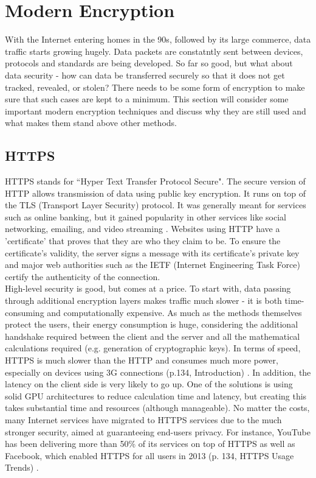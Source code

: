 \documentclass[a4paper, 12pt, titlepage]{article}
\begin{document}
\section{Modern Encryption}
With the Internet entering homes in the 90s, followed by its large commerce, data traffic starts growing hugely. Data packets are constatntly sent between devices, protocols and standards are being developed. So far so good, but what about data security - how can data be transferred securely so that it does not get tracked, revealed, or stolen? There needs to be some form of encryption to make sure that such cases are kept to a minimum. This section will consider some important modern encryption techniques and discuss why they are still used and what makes them stand above other methods.

\subsection{HTTPS}
HTTPS stands for ``Hyper Text Transfer Protocol Secure". The secure version of HTTP allows transmission of data using public key encryption. It runs on top of the TLS (Transport Layer Security) protocol. It was generally meant for services such as online banking, but it gained popularity in other services like social networking, emailing, and video streaming \cite{HTTPSCosts}. Websites using HTTP have a 'certificate' that proves that they are who they claim to be. To ensure the certificate's validity, the server signs a message with its certificate's private key and major web authorities such as the IETF (Internet Engineering Task Force) certify the authenticity of the connection. \\[6pt]
High-level security is good, but comes at a price. To start with, data passing through additional encryption layers makes traffic much slower - it is both time-consuming and computationally expensive. As much as the methods themselves protect the users, their energy consumption is huge, considering the additional handshake required between the client and the server and all the mathematical calculations required (e.g. generation of cryptographic keys). In terms of speed, HTTPS is much slower than the HTTP and consumes much more power, especially on devices using 3G connections (p.134, Introduction) \cite{HTTPSCosts}. In addition, the latency on the client side is very likely to go up. One of the solutions is using solid GPU architectures to reduce calculation time and latency, but creating this takes substantial time and resources (although manageable). No matter the costs, many Internet services have migrated to HTTPS services due to the much stronger security, aimed at guaranteeing end-users privacy. For instance, YouTube has been delivering more than 50\% of its services on top of HTTPS as well as Facebook, which enabled HTTPS for all users in 2013 (p. 134, HTTPS Usage Trends) \cite{HTTPSCosts}.
\end{document}
